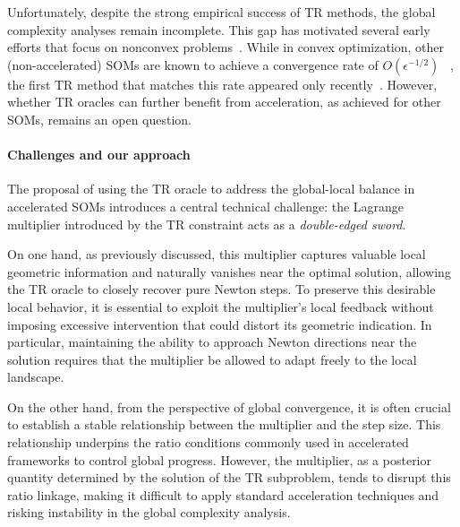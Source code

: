 Unfortunately, despite the strong empirical success of TR methods, the global complexity analyses remain incomplete. This gap has motivated several early efforts that focus on nonconvex problems~\cite{yeSecondOrderOptimization2005,curtis2017trust,curtis2021trust,zhangHomogeneousSecondorderDescent2025,hamad2022consistently,grapiglia2015convergence}.
While in convex optimization, other (non-accelerated) SOMs are known to achieve a convergence rate of \( O(\epsilon^{-1/2}) \) ~\cite{nesterov2006cubic,nesterov2008accelerating,mishchenko_regularized_2023}, the first TR method that matches this rate appeared only recently~\cite{jiang2024nonconvexityuniversaltrustregionmethod}. However, whether TR oracles can further benefit from acceleration, as achieved for other SOMs, remains an open question.

\paragraph{Challenges and our approach}
The proposal of using the TR oracle to address the global-local balance in accelerated SOMs introduces a central technical challenge: the Lagrange multiplier introduced by the TR constraint acts as a \textit{double-edged sword}.

On one hand, as previously discussed, this multiplier captures valuable local geometric information and naturally vanishes near the optimal solution, allowing the TR oracle to closely recover pure Newton steps. To preserve this desirable local behavior, it is essential to exploit the multiplier's local feedback without imposing excessive intervention that could distort its geometric indication. In particular, maintaining the ability to approach Newton directions near the solution requires that the multiplier be allowed to adapt freely to the local landscape.

On the other hand, from the perspective of global convergence, it is often crucial to establish a stable relationship between the multiplier and the step size. This relationship underpins the ratio conditions commonly used in accelerated frameworks to control global progress. However, the multiplier, as a posterior quantity determined by the solution of the TR subproblem, tends to disrupt this ratio linkage, making it difficult to apply standard acceleration techniques and risking instability in the global complexity analysis.

